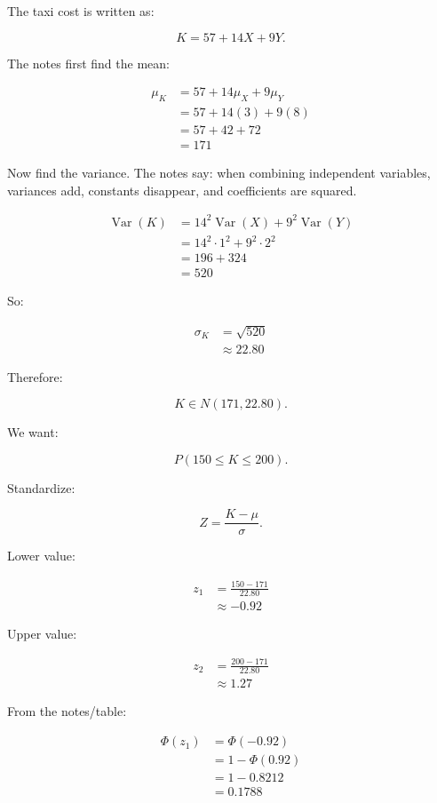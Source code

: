 \documentclass[10pt]{article}
\begin{document}
The taxi cost is written as:

\[
K=57+14X+9Y.
\]

The notes first find the mean:

\begin{align*}
\mu_K
&=
57+14\mu_X+9\mu_Y \\[2mm]
&=
57+14(3)+9(8) \\[2mm]
&=
57+42+72 \\[2mm]
&=171
\end{align*}

Now find the variance.
The notes say:
when combining independent variables, variances add,
constants disappear, and coefficients are squared.

\begin{align*}
\operatorname{Var}(K)
&=
14^2\operatorname{Var}(X)
+9^2\operatorname{Var}(Y) \\[2mm]
&=
14^2\cdot 1^2
+9^2\cdot 2^2 \\[2mm]
&=
196+324 \\[2mm]
&=520
\end{align*}

So:

\begin{align*}
\sigma_K
&=
\sqrt{520} \\[2mm]
&\approx 22.80
\end{align*}

Therefore:

\[
K\in N(171,22.80).
\]

We want:

\[
P(150\leq K\leq 200).
\]

Standardize:

\[
Z=\frac{K-\mu}{\sigma}.
\]

Lower value:

\begin{align*}
z_1
&=
\frac{150-171}{22.80} \\[2mm]
&\approx -0.92
\end{align*}

Upper value:

\begin{align*}
z_2
&=
\frac{200-171}{22.80} \\[2mm]
&\approx 1.27
\end{align*}

From the notes/table:

\begin{align*}
\Phi(z_1)
&=
\Phi(-0.92) \\[2mm]
&=
1-\Phi(0.92) \\[2mm]
&=
1-0.8212 \\[2mm]
&=0.1788
\end{align*}
\end{document}
